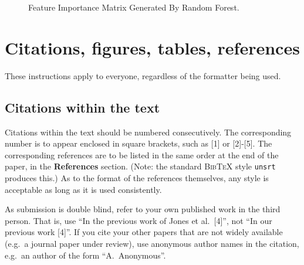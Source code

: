 \documentclass{article} %
\begin{document}
\begin{figure}[h]
	\begin{center}
	\end{center}
	\caption{Feature Importance Matrix Generated By Random Forest.}
\end{figure}
 


\section{Citations, figures, tables, references}
\label{others}

These instructions apply to everyone, regardless of the formatter being used.

\subsection{Citations within the text}

Citations within the text should be numbered consecutively. The corresponding
number is to appear enclosed in square brackets, such as [1] or [2]-[5]. The
corresponding references are to be listed in the same order at the end of the
paper, in the \textbf{References} section. (Note: the standard
\textsc{Bib\TeX} style \texttt{unsrt} produces this.) As to the format of the
references themselves, any style is acceptable as long as it is used
consistently.

As submission is double blind, refer to your own published work in the 
third person. That is, use ``In the previous work of Jones et al.\ [4]'',
not ``In our previous work [4]''. If you cite your other papers that
are not widely available (e.g.\ a journal paper under review), use
anonymous author names in the citation, e.g.\ an author of the
form ``A.\ Anonymous''. 
\end{document}
